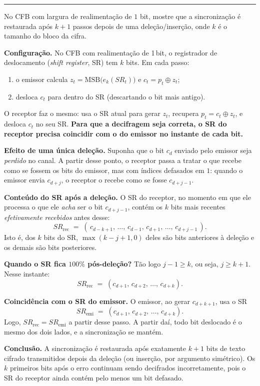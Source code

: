 \documentclass[12pt,a4paper]{article}
\newcommand{\exercicio}[1]{%
    \par\vspace{1.2em}
    \noindent
    {\color{black!55}\rule[-0.25em]{3pt}{1.6em}}%
    \hspace{0.6em}{\Large\bfseries Exerc\'{i}cio #1}
    \par\vspace{-0.4em}
    \noindent{\color{black!35}\rule{\textwidth}{0.4pt}}
    \par\vspace{0.35em}
}
\newenvironment{resposta}{%
    \begin{respostabox}
    \color{red!70!black}\sloppy
}{%
    \end{respostabox}
}
\begin{document}
\exercicio{14}
No CFB com largura de realimentação de $1$ bit, mostre que a sincronização é restaurada após $k+1$ passos depois de uma deleção/inserção, onde $k$ é o tamanho do bloco da cifra.

\begin{resposta}

\textbf{Configuração.} No CFB com realimentação de 1\,bit, o registrador de deslocamento (\emph{shift register}, SR) tem $k$ bits. Em cada passo:
\begin{enumerate}[label=(\alph*)]
    \item o emissor calcula $z_t = \mathrm{MSB}\!\bigl(e_k(SR_t)\bigr)$ e $c_t = p_t \oplus z_t$;
    \item desloca $c_t$ para dentro do SR (descartando o bit mais antigo).
\end{enumerate}
O receptor faz o mesmo: usa o SR atual para gerar $z_t$, recupera $p_t = c_t \oplus z_t$, e desloca $c_t$ no seu SR. \textbf{Para que a decifragem seja correta, o SR do receptor precisa coincidir com o do emissor no instante de cada bit.}

\textbf{Efeito de uma única deleção.} Suponha que o bit $c_d$ enviado pelo emissor seja \emph{perdido} no canal. A partir desse ponto, o receptor passa a tratar o que recebe como se fossem os bits do emissor, mas com índices defasados em $1$: quando o emissor envia $c_{d+j}$, o receptor o recebe como se fosse $c_{d+j-1}$.

\textbf{Conteúdo do SR após a deleção.} O SR do receptor, no momento em que ele processa o que ele \emph{acha} ser o bit $c_{d+j-1}$, contém os $k$ bits mais recentes \emph{efetivamente recebidos} antes desse:
\[
SR_{\text{rec}} \;=\; (\,c_{d-k+1},\, \ldots,\, c_{d-1},\, c_{d+1},\, \ldots,\, c_{d+j-1}\,).
\]
Isto é, dos $k$ bits do SR, $\max(k - j + 1, 0)$ deles são bits anteriores à deleção e os demais são bits posteriores.

\textbf{Quando o SR fica $100\%$ pós-deleção?} Tão logo $j - 1 \geq k$, ou seja, $j \geq k + 1$. Nesse instante:
\[
SR_{\text{rec}} \;=\; (c_{d+1},\, c_{d+2},\, \ldots,\, c_{d+k}).
\]

\textbf{Coincidência com o SR do emissor.} O emissor, ao gerar $c_{d+k+1}$, usa o SR
\[
SR_{\text{emi}} \;=\; (c_{d+1},\, c_{d+2},\, \ldots,\, c_{d+k}).
\]
Logo, $SR_{\text{rec}} = SR_{\text{emi}}$ a partir desse passo. A partir daí, todo bit deslocado é o mesmo dos dois lados, e a sincronização se mantém.

\textbf{Conclusão.} A sincronização é restaurada após exatamente $k+1$ bits de texto cifrado transmitidos depois da deleção (ou inserção, por argumento simétrico). Os $k$ primeiros bits após o erro continuam sendo decifrados incorretamente, pois o SR do receptor ainda contém pelo menos um bit defasado.

\end{resposta}
\end{document}
